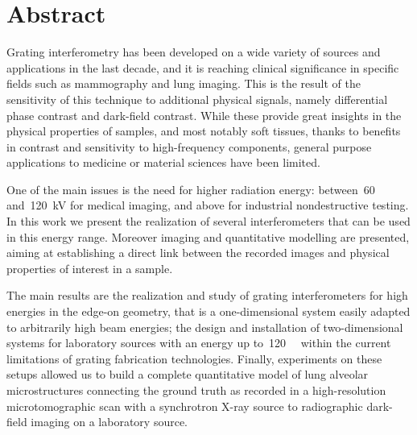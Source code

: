 \begingroup
\let\clearpage\relax
\let\cleardoublepage\relax
\let\cleardoublepage\relax

\chapter*{Abstract}
Grating interferometry has been developed on a wide variety of sources and
applications in the last decade, and it is reaching clinical significance in
specific fields such as mammography and lung imaging. This is the
result of the sensitivity of this technique to additional physical signals,
namely differential phase contrast and dark-field contrast. While these
provide great insights in the physical properties of samples, and most
notably soft tissues, thanks to benefits in contrast and sensitivity to
high-frequency components, general purpose applications to medicine or
material sciences have been limited.

One of the main issues is the need for higher radiation energy:
between~\num{60} and~\SI{120}{\kilo\volt} for medical imaging, and above for
industrial nondestructive testing. In this work we present the realization
of several interferometers that can be used in this energy range. Moreover
imaging and quantitative modelling are presented, aiming at establishing a
direct link between the recorded images and physical properties of interest
in a sample.

The main results are the realization and study of grating interferometers for
high energies in the edge-on geometry, that is a one-dimensional system
easily adapted to arbitrarily high beam energies; the design and
installation of
two-dimensional systems for laboratory sources with an energy up
to~\SI{120}{\kilo\voltpeak} within the current limitations of grating
fabrication technologies. Finally, experiments on these setups allowed us
to build a complete quantitative model of lung alveolar
microstructures connecting the ground truth as recorded in a high-resolution
microtomographic scan with a synchrotron X-ray source to radiographic
dark-field imaging on a laboratory source.

\newpage

